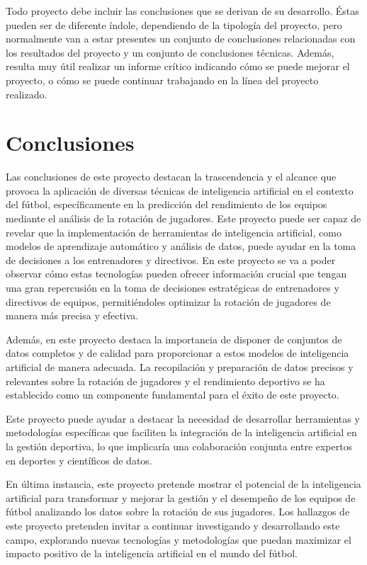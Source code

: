
Todo proyecto debe incluir las conclusiones que se derivan de su desarrollo. Éstas pueden ser de diferente índole, dependiendo de la tipología del proyecto, pero normalmente van a estar presentes un conjunto de conclusiones relacionadas con los resultados del proyecto y un conjunto de conclusiones técnicas. 
Además, resulta muy útil realizar un informe crítico indicando cómo se puede mejorar el proyecto, o cómo se puede continuar trabajando en la línea del proyecto realizado. 


\section{Conclusiones}
Las conclusiones de este proyecto destacan la trascendencia y el alcance que provoca la aplicación de diversas técnicas de inteligencia artificial en el contexto del fútbol, específicamente en la predicción del rendimiento de los equipos mediante el análisis de la rotación de jugadores. Este proyecto puede ser capaz de revelar que la implementación de herramientas de inteligencia artificial, como modelos de aprendizaje automático y análisis de datos, puede ayudar en la toma de decisiones a los entrenadores y directivos. En este proyecto se va a poder observar cómo estas tecnologías pueden ofrecer información crucial que tengan una gran repercusión en la toma de decisiones estratégicas de entrenadores y directivos de equipos, permitiéndoles optimizar la rotación de jugadores de manera más precisa y efectiva.

Además, en este proyecto destaca la importancia de disponer de conjuntos de datos completos y de calidad para proporcionar a estos modelos de inteligencia artificial de manera adecuada. La recopilación y preparación de datos precisos y relevantes sobre la rotación de jugadores y el rendimiento deportivo se ha establecido como un componente fundamental para el éxito de este proyecto. 

Este proyecto puede ayudar a destacar la necesidad de desarrollar herramientas y metodologías específicas que faciliten la integración de la inteligencia artificial en la gestión deportiva, lo que implicaría una colaboración conjunta entre expertos en deportes y científicos de datos.

En última instancia, este proyecto pretende mostrar el potencial de la inteligencia artificial para transformar y mejorar la gestión y el desempeño de los equipos de fútbol analizando los datos sobre la rotación de sus jugadores. Los hallazgos de este proyecto pretenden invitar a continuar investigando y desarrollando este campo, explorando nuevas tecnologías y metodologías que puedan maximizar el impacto positivo de la inteligencia artificial en el mundo del fútbol.












